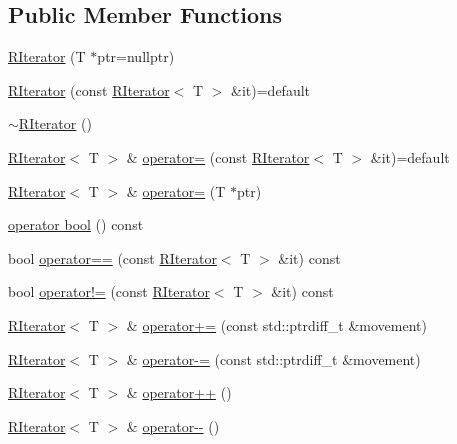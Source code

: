\subsection*{Public Member Functions}
\begin{DoxyCompactItemize}
\item 
\hyperlink{classCore_1_1RIterator_a78fd039a12776b6603ce00d3c735c376}{R\+Iterator} (T $\ast$ptr=nullptr)
\item 
\hyperlink{classCore_1_1RIterator_a705eaa2ee97becba55487af931c2569f}{R\+Iterator} (const \hyperlink{classCore_1_1RIterator}{R\+Iterator}$<$ T $>$ \&it)=default
\item 
\hyperlink{classCore_1_1RIterator_ab56f396bdd61ce2c898ca66f2a475673}{$\sim$\+R\+Iterator} ()
\item 
\hyperlink{classCore_1_1RIterator}{R\+Iterator}$<$ T $>$ \& \hyperlink{classCore_1_1RIterator_ad840f368edd2996e6980f94879c414f3}{operator=} (const \hyperlink{classCore_1_1RIterator}{R\+Iterator}$<$ T $>$ \&it)=default
\item 
\hyperlink{classCore_1_1RIterator}{R\+Iterator}$<$ T $>$ \& \hyperlink{classCore_1_1RIterator_a94e7649750026af99412ee0a080c783a}{operator=} (T $\ast$ptr)
\item 
\hyperlink{classCore_1_1RIterator_a2d7e2c6a0ee9d2559fbc919ef6f0f341}{operator bool} () const 
\item 
bool \hyperlink{classCore_1_1RIterator_acd463ba36d1020ec4516b1989b96b270}{operator==} (const \hyperlink{classCore_1_1RIterator}{R\+Iterator}$<$ T $>$ \&it) const 
\item 
bool \hyperlink{classCore_1_1RIterator_a49cb3082b5827297c06f5d3ce3cbd88a}{operator!=} (const \hyperlink{classCore_1_1RIterator}{R\+Iterator}$<$ T $>$ \&it) const 
\item 
\hyperlink{classCore_1_1RIterator}{R\+Iterator}$<$ T $>$ \& \hyperlink{classCore_1_1RIterator_a6362bde248a7123430f5cc180e181ae9}{operator+=} (const std\+::ptrdiff\+\_\+t \&movement)
\item 
\hyperlink{classCore_1_1RIterator}{R\+Iterator}$<$ T $>$ \& \hyperlink{classCore_1_1RIterator_a60ec58d55d871408f59707a1cd3211ed}{operator-\/=} (const std\+::ptrdiff\+\_\+t \&movement)
\item 
\hyperlink{classCore_1_1RIterator}{R\+Iterator}$<$ T $>$ \& \hyperlink{classCore_1_1RIterator_a42838da5641e16964b223285e7d2582c}{operator++} ()
\item 
\hyperlink{classCore_1_1RIterator}{R\+Iterator}$<$ T $>$ \& \hyperlink{classCore_1_1RIterator_a44ed38e2d3f689867c35efd944c53cec}{operator-\/-\/} ()

\end{DoxyCompactItemize}
